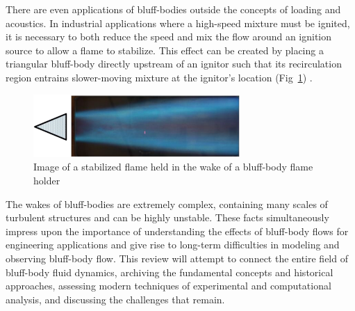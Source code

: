 \documentclass[journal]{new-aiaa}
\begin{document}
There are even applications of bluff-bodies outside the concepts of loading and acoustics. In industrial applications where a high-speed mixture must be ignited, it is necessary to both reduce the speed and mix the flow around an ignition source to allow a flame to stabilize. This effect can be created by placing a triangular bluff-body directly upstream of an ignitor such that its recirculation region entrains slower-moving mixture at the ignitor's location (Fig~\ref{fig:flameholder}) \cite{li2011large}.

\begin{figure}[H]
\begin{center}
\includegraphics[width=0.7\textwidth]{Images/logan/tanaka2013bluff_FlameHolder.pdf}
\caption{ Image of a stabilized flame held in the wake of a bluff-body flame holder \cite{tanaka2013bluff} }
\label{fig:flameholder}
\end{center}
\end{figure}



The wakes of bluff-bodies are extremely complex, containing many scales of turbulent structures and can be highly unstable. These facts simultaneously impress upon the importance of understanding the effects of bluff-body flows for engineering applications and give rise to long-term difficulties in modeling and observing bluff-body flow. This review will attempt to connect the entire field of bluff-body fluid dynamics, archiving the fundamental concepts and historical approaches, assessing modern techniques of experimental and computational analysis, and discussing the challenges that remain.



\end{document}
